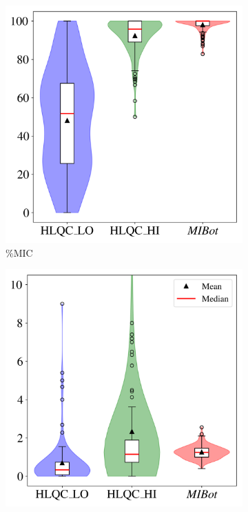 \begin{figure}[ht]
  \centering
  \begin{subfigure}[b]{0.32\textwidth}
    \centering
    \includegraphics[width=\textwidth]{fig/mic.png}
    \caption{\%MIC}
  \end{subfigure}
  \hfill
  \begin{subfigure}[b]{0.32\textwidth}
    \centering
    \includegraphics[width=\textwidth]{fig/rq.png}

\end{subfigure}
\end{figure}
